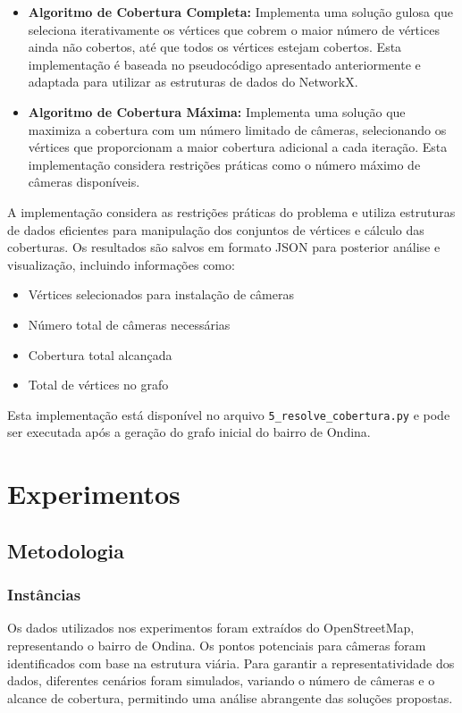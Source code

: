 \documentclass[12pt, a4paper]{report}
\begin{document}
\begin{itemize}
    \item \textbf{Algoritmo de Cobertura Completa:} Implementa uma solução gulosa que seleciona iterativamente os vértices que cobrem o maior número de vértices ainda não cobertos, até que todos os vértices estejam cobertos. Esta implementação é baseada no pseudocódigo apresentado anteriormente e adaptada para utilizar as estruturas de dados do NetworkX.
    
    \item \textbf{Algoritmo de Cobertura Máxima:} Implementa uma solução que maximiza a cobertura com um número limitado de câmeras, selecionando os vértices que proporcionam a maior cobertura adicional a cada iteração. Esta implementação considera restrições práticas como o número máximo de câmeras disponíveis.
\end{itemize}

A implementação considera as restrições práticas do problema e utiliza estruturas de dados eficientes para manipulação dos conjuntos de vértices e cálculo das coberturas. Os resultados são salvos em formato JSON para posterior análise e visualização, incluindo informações como:

\begin{itemize}
    \item Vértices selecionados para instalação de câmeras
    \item Número total de câmeras necessárias
    \item Cobertura total alcançada
    \item Total de vértices no grafo
\end{itemize}

Esta implementação está disponível no arquivo \texttt{5\_resolve\_cobertura.py} e pode ser executada após a geração do grafo inicial do bairro de Ondina.

\chapter{Experimentos}

\section{Metodologia}
\subsection{Instâncias}
Os dados utilizados nos experimentos foram extraídos do OpenStreetMap, representando o bairro de Ondina. Os pontos potenciais para câmeras foram identificados com base na estrutura viária. Para garantir a representatividade dos dados, diferentes cenários foram simulados, variando o número de câmeras e o alcance de cobertura, permitindo uma análise abrangente das soluções propostas.
\end{document}
